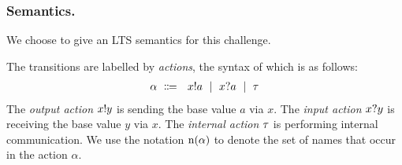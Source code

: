 
\subsubsection{Semantics.} We choose to give an LTS semantics for this
challenge. %

The transitions are labelled by \emph{actions}, the syntax
of which is as follows:
\begin{align*}
  \alpha\ \Coloneqq\ \ x ! a \ \mid\ x ? a \ \mid\ \tau
\end{align*}
The \emph{output action} \( x ! y \) is sending the base value
\( a \) via \( x \).  The \emph{input action} \( x ? y \) is
receiving the base value \( y \) via \( x \).  The \emph{internal
  action} \( \tau \) is performing internal communication.
%
We use the notation \( \textrm{n}(\alpha) \) to denote the set of
names that occur in the action \( \alpha \).

